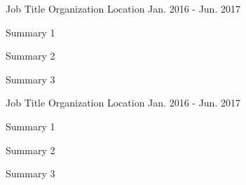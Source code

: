 

\begin{cventries}

   \cventry
    {Job Title} %
    {Organization} %
    {Location} %
    {Jan. 2016 - Jun. 2017} %
    {
      \begin{cvitems} %
        \item {Summary 1}
        \item {Summary 2}
        \item {Summary 3}
      \end{cvitems}
    }

  \cventry
    {Job Title} %
    {Organization} %
    {Location} %
    {Jan. 2016 - Jun. 2017} %
    {
      \begin{cvitems} %
        \item {Summary 1}
        \item {Summary 2}
        \item {Summary 3}
      \end{cvitems}
    }

\end{cventries}

